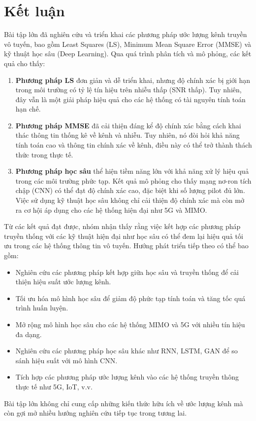 \section{Kết luận}

Bài tập lớn đã nghiên cứu và triển khai các phương pháp ước lượng kênh truyền vô tuyến, bao gồm Least Squares (LS), Minimum Mean Square Error (MMSE) và kỹ thuật học sâu (Deep Learning). Qua quá trình phân tích và mô phỏng, các kết quả cho thấy:

\begin{enumerate}
    \item \textbf{Phương pháp LS} đơn giản và dễ triển khai, nhưng độ chính xác bị giới hạn trong môi trường có tỷ lệ tín hiệu trên nhiễu thấp (SNR thấp). Tuy nhiên, đây vẫn là một giải pháp hiệu quả cho các hệ thống có tài nguyên tính toán hạn chế.
    
    \item \textbf{Phương pháp MMSE} đã cải thiện đáng kể độ chính xác bằng cách khai thác thông tin thống kê về kênh và nhiễu. Tuy nhiên, nó đòi hỏi khả năng tính toán cao và thông tin chính xác về kênh, điều này có thể trở thành thách thức trong thực tế.
    
    \item \textbf{Phương pháp học sâu} thể hiện tiềm năng lớn với khả năng xử lý hiệu quả trong các môi trường phức tạp. Kết quả mô phỏng cho thấy mạng nơ-ron tích chập (CNN) có thể đạt độ chính xác cao, đặc biệt khi số lượng pilot đủ lớn. Việc sử dụng kỹ thuật học sâu không chỉ cải thiện độ chính xác mà còn mở ra cơ hội áp dụng cho các hệ thống hiện đại như 5G và MIMO.
\end{enumerate}

Từ các kết quả đạt được, nhóm nhận thấy rằng việc kết hợp các phương pháp truyền thống với các kỹ thuật hiện đại như học sâu có thể đem lại hiệu quả tối ưu trong các hệ thống thông tin vô tuyến. Hướng phát triển tiếp theo có thể bao gồm:

\begin{itemize}
    \item Nghiên cứu các phương pháp kết hợp giữa học sâu và truyền thống để cải thiện hiệu suất ước lượng kênh.
    \item Tối ưu hóa mô hình học sâu để giảm độ phức tạp tính toán và tăng tốc quá trình huấn luyện.
    \item Mở rộng mô hình học sâu cho các hệ thống MIMO và 5G với nhiều tín hiệu đa dạng.
    \item Nghiên cứu các phương pháp học sâu khác như RNN, LSTM, GAN để so sánh hiệu suất với mô hình CNN.
    \item Tích hợp các phương pháp ước lượng kênh vào các hệ thống truyền thông thực tế như 5G, IoT, v.v.
\end{itemize}

Bài tập lớn không chỉ cung cấp những kiến thức hữu ích về ước lượng kênh mà còn gợi mở nhiều hướng nghiên cứu tiếp tục trong tương lai.